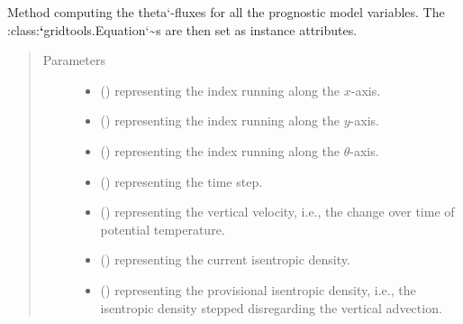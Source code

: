 \documentclass[letterpaper,10pt,english]{sphinxmanual}
\begin{document}
\begin{fulllineitems}
\begin{fulllineitems}
\label{\detokenize{api:dycore.flux_isentropic_nonconservative_centered.FluxIsentropicNonconservativeCentered._compute_vertical_fluxes}}
Method computing the theta{}`-fluxes for all the
prognostic model variables. The :class:{\color{red}\bfseries{}{}`}gridtools.Equation{}`\textasciitilde{}s are then set as instance attributes.
\begin{quote}\begin{description}
\item[{Parameters}] \leavevmode\begin{itemize}
\item {} 
 () \textendash{}  representing the index running along the \(x\)-axis.

\item {} 
 () \textendash{}  representing the index running along the \(y\)-axis.

\item {} 
 () \textendash{}  representing the index running along the \(\theta\)-axis.

\item {} 
 () \textendash{}  representing the time step.

\item {} 
 () \textendash{}  representing the vertical velocity, i.e.,
the change over time of potential temperature.

\item {} 
 () \textendash{}  representing the current isentropic density.

\item {} 
 () \textendash{}  representing the provisional isentropic density, i.e.,
the isentropic density stepped disregarding the vertical advection.


\end{itemize}
\end{description}
\end{quote}
\end{fulllineitems}
\end{fulllineitems}
\end{document}

